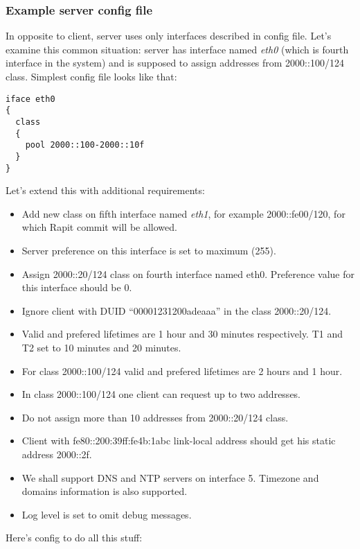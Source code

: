 \begin{tabular}{|c|c|>{\centering}p{1.7cm}<{}|c|p{6cm}|}
\hline
\end{tabular}

\subsubsection{Example server config file}

In opposite to client, server uses only interfaces described in config
file. Let's examine this common situation: server has interface
named \emph{eth0} (which is fourth interface in the system) and is
supposed to assign addresses from 2000::100/124 class. Simplest config
file looks like that:

\begin{verbatim}
iface eth0
{ 
  class
  {
    pool 2000::100-2000::10f
  } 
}
\end{verbatim}

Let's extend this with additional requirements:
\begin{itemize}
\item Add new class on fifth interface named \emph{eth1}, for example 2000::fe00/120, for
  which Rapit commit will be allowed.
\item Server preference on this interface is set to maximum (255).
\item Assign 2000::20/124 class on fourth interface named
  eth0. Preference value for this interface should be 0.
\item Ignore client with DUID ``00001231200adeaaa'' in the class
  2000::20/124.
\item Valid and prefered lifetimes are 1 hour and 30 minutes
  respectively. T1 and T2 set to 10 minutes and 20 minutes.
\item For class 2000::100/124 valid and prefered lifetimes are 2 hours
  and 1 hour.
\item In class 2000::100/124 one client can request up to two
  addresses.
\item Do not assign more than 10 addresses from 2000::20/124 class.
\item Client with fe80::200:39ff:fe4b:1abc link-local address should
  get his static address 2000::2f.
\item We shall support DNS and NTP servers on interface 5. Timezone
  and domains information is also supported.
\item Log level is set to omit debug messages.
\end{itemize}

Here's config to do all this stuff:


